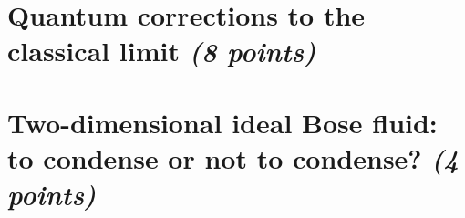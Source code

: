 \documentclass[11 pt]{article}
\begin{document}
    \section{
        Quantum corrections to the classical limit \textit{(8 points)}
    }
    
    \newpage

    \section{Two-dimensional ideal Bose fluid: to 
        condense or not to condense? \textit{(4 points)}
    }
    
    \newpage
\end{document}
